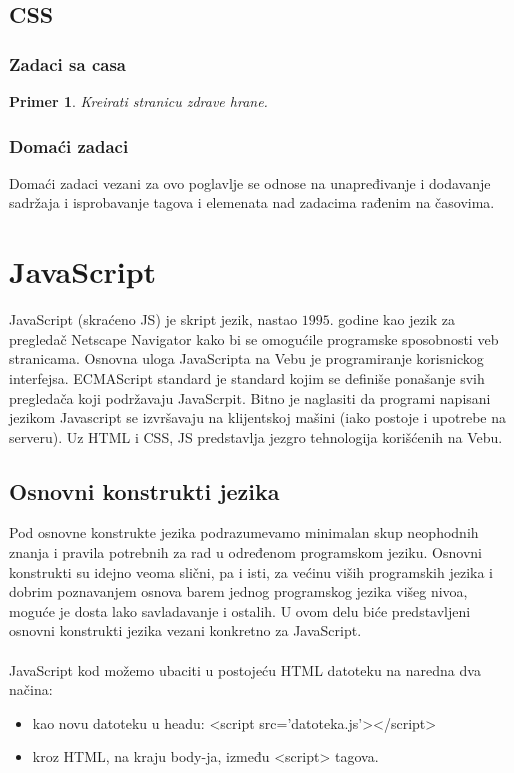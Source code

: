 \documentclass[a4paper]{article}
\newtheorem{primer}{Primer}[section]
\begin{document}
\subsection{CSS}
\subsubsection{Zadaci sa casa}

\begin{primer}
Kreirati stranicu zdrave hrane.
\end{primer}

\subsubsection{Domaći zadaci}
Domaći zadaci vezani za ovo poglavlje se odnose na unapređivanje i dodavanje sadržaja i isprobavanje tagova i elemenata nad zadacima rađenim na časovima. 

\newpage

\section{JavaScript}
\label{sec:javascript}

JavaScript (skraćeno JS) je skript jezik, nastao $1995$. godine kao jezik za pregledač Netscape Navigator kako bi se omogućile programske sposobnosti veb stranicama. Osnovna uloga JavaScripta na Vebu je programiranje korisnickog interfejsa. ECMAScript standard je standard kojim se definiše ponašanje svih pregledača koji podržavaju JavaScrpit. Bitno je naglasiti da programi napisani jezikom Javascript se izvršavaju na klijentskoj mašini (iako postoje i upotrebe na serveru). Uz HTML i CSS, JS predstavlja jezgro tehnologija korišćenih na Vebu.

\subsection{Osnovni konstrukti jezika}
Pod osnovne konstrukte jezika podrazumevamo minimalan skup neophodnih znanja i pravila potrebnih za rad u određenom programskom jeziku. Osnovni konstrukti su idejno veoma slični, pa i isti, za većinu viših programskih jezika i dobrim poznavanjem osnova barem jednog programskog jezika višeg nivoa, moguće je dosta lako savladavanje i ostalih. U ovom delu biće predstavljeni osnovni konstrukti jezika vezani konkretno za JavaScript.\\\\
JavaScript kod možemo ubaciti u postojeću HTML datoteku na naredna dva načina:
\begin{itemize}
    \item kao novu datoteku u headu: <script src='datoteka.js'></script> 
    \item kroz HTML, na kraju body-ja, između <script> tagova.
\end{itemize}
\end{document}

